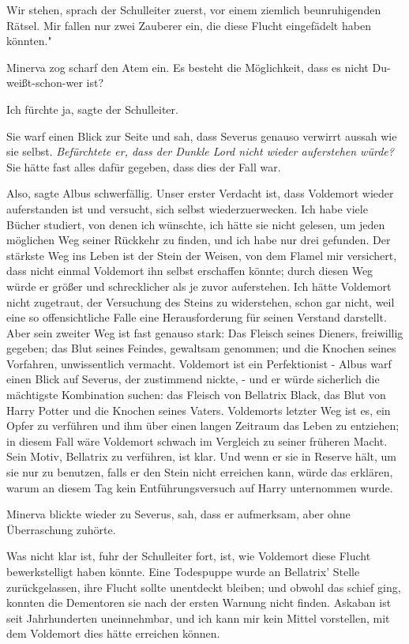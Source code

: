 \glqq{}Wir stehen\grqq{}, sprach der Schulleiter zuerst, \glqq{}vor einem ziemlich
beunruhigenden Rätsel. Mir fallen nur zwei Zauberer ein, die diese Flucht
eingefädelt haben könnten."

Minerva zog scharf den Atem ein. \glqq{}Es besteht die Möglichkeit, dass es nicht
Du-weißt-schon-wer ist?\grqq{}

\glqq{}Ich fürchte ja\grqq{}, sagte der Schulleiter.

Sie warf einen Blick zur Seite und sah, dass Severus genauso verwirrt aussah wie
sie selbst. \emph{Befürchtete er, dass der Dunkle Lord nicht wieder auferstehen
würde?} Sie hätte fast alles dafür gegeben, dass dies der Fall war.

\glqq{}Also\grqq{}, sagte Albus schwerfällig. \glqq{}Unser erster Verdacht ist,
dass Voldemort wieder auferstanden ist und versucht, sich selbst
wiederzuerwecken. Ich habe viele Bücher studiert, von denen ich wünschte, ich
hätte sie nicht gelesen, um jeden möglichen Weg seiner Rückkehr zu finden, und
ich habe nur drei gefunden. Der stärkste Weg ins Leben ist der Stein der Weisen,
von dem Flamel mir versichert, dass nicht einmal Voldemort ihn selbst erschaffen
könnte; durch diesen Weg würde er größer und schrecklicher als je zuvor
auferstehen. Ich hätte Voldemort nicht zugetraut, der Versuchung des Steins zu
widerstehen, schon gar nicht, weil eine so offensichtliche Falle eine
Herausforderung für seinen Verstand darstellt. Aber sein zweiter Weg ist fast
genauso stark: Das Fleisch seines Dieners, freiwillig gegeben; das Blut seines
Feindes, gewaltsam genommen; und die Knochen seines Vorfahren, unwissentlich
vermacht. Voldemort ist ein Perfektionist -\grqq{} Albus warf einen Blick auf
Severus, der zustimmend nickte, \glqq{}- und er würde sicherlich die mächtigste
Kombination suchen: das Fleisch von Bellatrix Black, das Blut von Harry Potter
und die Knochen seines Vaters. Voldemorts letzter Weg ist es, ein Opfer zu
verführen und ihm über einen langen Zeitraum das Leben zu entziehen; in diesem
Fall wäre Voldemort schwach im Vergleich zu seiner früheren Macht. Sein Motiv,
Bellatrix zu verführen, ist klar. Und wenn er sie in Reserve hält, um sie nur zu
benutzen, falls er den Stein nicht erreichen kann, würde das erklären, warum an
diesem Tag kein Entführungsversuch auf Harry unternommen wurde.\grqq{}

Minerva blickte wieder zu Severus, sah, dass er aufmerksam, aber ohne
Überraschung zuhörte.

\glqq{}Was nicht klar ist\grqq{}, fuhr der Schulleiter fort, \glqq{}ist, wie
Voldemort diese Flucht bewerkstelligt haben könnte. Eine Todespuppe wurde an
Bellatrix' Stelle zurückgelassen, ihre Flucht sollte unentdeckt bleiben; und
obwohl das schief ging, konnten die Dementoren sie nach der ersten Warnung nicht
finden. Askaban ist seit Jahrhunderten uneinnehmbar, und ich kann mir kein
Mittel vorstellen, mit dem Voldemort dies hätte erreichen können.\grqq{}

